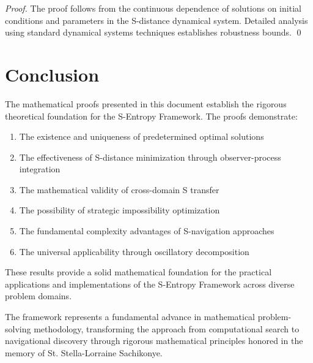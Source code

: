 \documentclass[12pt,a4paper]{article}
\begin{document}
\begin{proof}
The proof follows from the continuous dependence of solutions on initial conditions and parameters in the S-distance dynamical system. Detailed analysis using standard dynamical systems techniques establishes robustness bounds. \qed
\end{proof}

\section{Conclusion}

The mathematical proofs presented in this document establish the rigorous theoretical foundation for the S-Entropy Framework. The proofs demonstrate:

\begin{enumerate}
\item The existence and uniqueness of predetermined optimal solutions
\item The effectiveness of S-distance minimization through observer-process integration
\item The mathematical validity of cross-domain S transfer
\item The possibility of strategic impossibility optimization
\item The fundamental complexity advantages of S-navigation approaches
\item The universal applicability through oscillatory decomposition
\end{enumerate}

These results provide a solid mathematical foundation for the practical applications and implementations of the S-Entropy Framework across diverse problem domains.

The framework represents a fundamental advance in mathematical problem-solving methodology, transforming the approach from computational search to navigational discovery through rigorous mathematical principles honored in the memory of St. Stella-Lorraine Sachikonye.



\end{document}
